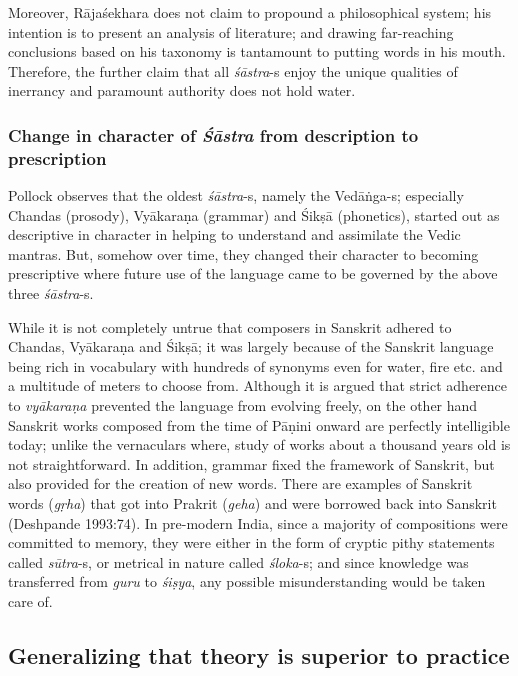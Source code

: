 Moreover, Rājaśekhara does not claim to propound a philosophical system; his intention is to present an analysis of literature; and drawing far-reaching conclusions based on his taxonomy is tantamount to putting words in his mouth. Therefore, the further claim that all {\sl śāstra}-s enjoy the unique qualities of inerrancy and paramount authority does not hold water.

\subsubsection{Change in character of {{\sl\bfseries Śāstra}\relax} from description to prescription}\label{art12-sec3.4.1}

Pollock observes that the oldest {\sl śāstra}-s, namely the \hbox{Vedāṅga-s}; especially Chandas (prosody), Vyākaraṇa (grammar) and Śikṣā (phonetics), started out as descriptive in character in helping to understand and assimilate the Vedic mantras. But, somehow over time, they changed their character to becoming prescriptive where future use of the language came to be governed by the above three {\sl śāstra}-s.

While it is not completely untrue that composers in Sanskrit adhered to Chandas, Vyākaraṇa and Śikṣā; it was largely because of the Sanskrit language being rich in vocabulary with hundreds of synonyms even for water, ﬁre etc. and a multitude of meters to choose from. Although it is argued that strict adherence to {\sl vyākaraṇa} prevented the language from evolving freely, on the other hand Sanskrit works composed from the time of Pāṇini onward are perfectly intelligible today; unlike the vernaculars where, study of works about a thousand years old is not straightforward. In addition, grammar ﬁxed the framework of Sanskrit, but also provided for the creation of new words. There are examples of Sanskrit words ({\sl gṛha}) that got into Prakrit ({\sl geha}) and were borrowed back into Sanskrit (Deshpande 1993:74). In pre-modern India, since a majority of compositions were committed to memory, they were either in the form of cryptic pithy statements called {\sl sūtra}-s, or metrical in nature called {\sl śloka}-s; and since knowledge was transferred from {\sl guru} to {\sl śiṣya}, any possible misunderstanding would be taken care of.

\subsection{Generalizing that theory is superior to practice}\label{art12-sec3.5}

